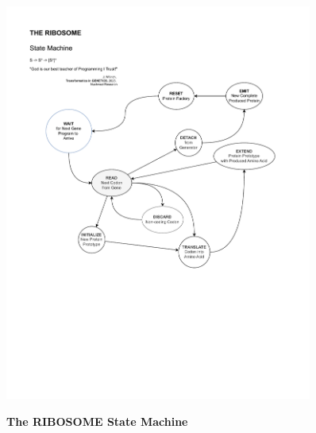 \documentclass[a4paper, 18pt]{book} %
\begin{document}
\begin{figure}[H]
  \begin{center}
   \includegraphics[trim=0cm 9cm 0cm 1.6cm, clip, width=0.9\textwidth,]{resources/pdfs/RibosomeStateMachine.pdf}\\
   \caption{\textbf{The RIBOSOME State Machine}}
  \label{FIG4}
  \end{center}
\end{figure}
\end{document}
